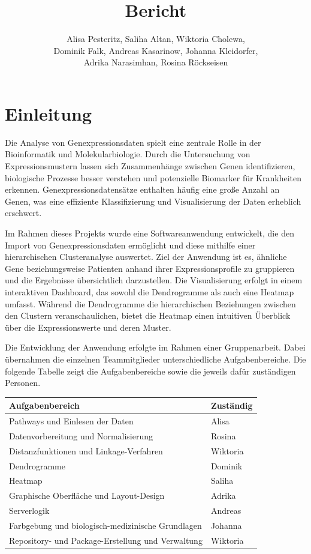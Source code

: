 \documentclass[12pt]{article}
\title{Bericht}
\author{Alisa Pesteritz, Saliha Altan, Wiktoria Cholewa, \\ 
	Dominik Falk, Andreas Kasarinow, Johanna Kleidorfer, \\
	Adrika Narasimhan, Rosina Röckseisen}
\begin{document}
\newpage
\maketitle

\newpage
\pagestyle{fancy}
\fancyhead{}
\section{Einleitung}
\label{einleitung}

Die Analyse von Genexpressionsdaten spielt eine zentrale Rolle in der Bioinformatik und Molekularbiologie. Durch die Untersuchung von Expressionsmustern lassen sich Zusammenhänge zwischen Genen identifizieren, biologische Prozesse besser verstehen und potenzielle Biomarker für Krankheiten erkennen. Genexpressionsdatensätze enthalten häufig eine große Anzahl an Genen, was eine effiziente Klassifizierung und Visualisierung der Daten erheblich erschwert. 

Im Rahmen dieses Projekts wurde eine Softwareanwendung entwickelt, die den Import von Genexpressionsdaten ermöglicht und diese mithilfe einer hierarchischen Clusteranalyse auswertet. Ziel der Anwendung ist es, ähnliche Gene beziehungsweise Patienten anhand ihrer Expressionsprofile zu gruppieren und die Ergebnisse übersichtlich darzustellen. Die Visualisierung erfolgt in einem interaktiven Dashboard, das sowohl die Dendrogramme als auch eine Heatmap umfasst. Während die Dendrogramme die hierarchischen Beziehungen zwischen den Clustern veranschaulichen, bietet die Heatmap einen intuitiven Überblick über die Expressionswerte und deren Muster.

Die Entwicklung der Anwendung erfolgte im Rahmen einer Gruppenarbeit. Dabei übernahmen die einzelnen Teammitglieder unterschiedliche Aufgabenbereiche. Die folgende Tabelle zeigt die Aufgabenbereiche sowie die jeweils dafür zuständigen Personen.

\begin{table}[h!]
	\centering
	\begin{tabular}{l|l}
		Aufgabenbereich & Zuständig \\ 
		\hline
		Pathways und Einlesen der Daten & Alisa \\
		Datenvorbereitung und Normalisierung & Rosina \\
		Distanzfunktionen und Linkage-Verfahren & Wiktoria \\
		Dendrogramme & Dominik \\
		Heatmap & Saliha \\
		Graphische Oberfläche und Layout-Design & Adrika \\
		Serverlogik & Andreas \\
		Farbgebung und biologisch-medizinische Grundlagen & Johanna \\
		Repository- und Package-Erstellung und Verwaltung & Wiktoria \\
	\end{tabular}
\end{table}
\end{document}
